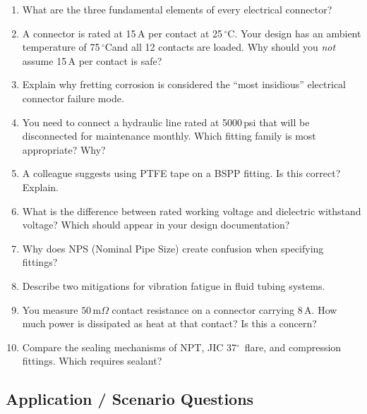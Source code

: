 \documentclass[11pt,letterpaper,twoside,openany]{book}
\newcommand{\mohm}{\,\text{m}\Omega}
\newcommand{\degC}{\ensuremath{{}^{\circ}\text{C}}}
\begin{document}
\begin{enumerate}[leftmargin=1.5em]
  \item What are the three fundamental elements of every electrical connector?

  \item A connector is rated at 15\,A per contact at 25\,\degC. Your design has an ambient temperature of 75\,\degC and all 12 contacts are loaded. Why should you \emph{not} assume 15\,A per contact is safe?

  \item Explain why fretting corrosion is considered the ``most insidious'' electrical connector failure mode.

  \item You need to connect a hydraulic line rated at 5000\,psi that will be disconnected for maintenance monthly. Which fitting family is most appropriate? Why?

  \item A colleague suggests using PTFE tape on a BSPP fitting. Is this correct? Explain.

  \item What is the difference between rated working voltage and dielectric withstand voltage? Which should appear in your design documentation?

  \item Why does NPS (Nominal Pipe Size) create confusion when specifying fittings?

  \item Describe two mitigations for vibration fatigue in fluid tubing systems.

  \item You measure $50\mohm$ contact resistance on a connector carrying 8\,A. How much power is dissipated as heat at that contact? Is this a concern?

  \item Compare the sealing mechanisms of NPT, JIC 37$^{\circ}$\ flare, and compression fittings. Which requires sealant?
\end{enumerate}

\subsection{Application / Scenario Questions}
\end{document}
